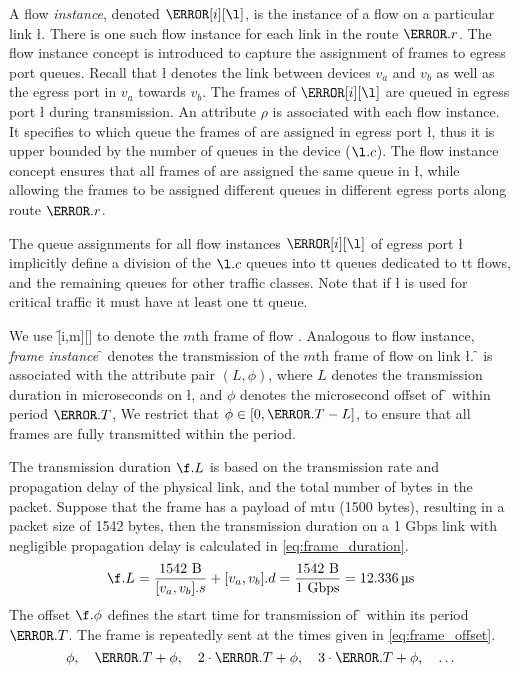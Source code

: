 A flow \emph{instance}, denoted $\s[i][\l]$, is the instance of a flow \s{} on a particular link \l.
There is one such flow instance for each link in the route $\s.r$.
The flow instance concept is introduced to capture the assignment of frames to egress port queues.
Recall that \l{} denotes the link between devices $v_a$ and $v_b$ as well as the egress port in $v_a$ towards $v_b$.
The frames of $\s[i][\l]$ are queued in egress port \l{} during transmission.
An attribute $\rho$ is associated with each flow instance. It specifies to which queue the frames of \s{} are assigned in egress port \l, thus it is upper bounded by the number of queues in the device ($\l.c$).
The flow instance concept ensures that all frames of \s{} are assigned the same queue in \l, while allowing the frames to be assigned different queues in different egress ports along route $\s.r$.

The queue assignments for all flow instances $\s[i][\l]$ of egress port \l{} implicitly define a division of the $\l.c$ queues into \gls{tt} queues dedicated to \gls{tt} flows, and the remaining queues for other traffic classes. Note that if \l{} is used for critical traffic it must have at least one \gls{tt} queue.

We use \f[i,m][] to denote the $m$th frame of flow \s{}. Analogous to flow instance, \emph{frame instance} \f{} denotes the transmission of the $m$th frame of flow \s{} on link \l{}. \f{} is associated with the attribute pair $(L, \phi)$, where $L$ denotes the transmission duration in microseconds on \l{}, and $\phi$ denotes the microsecond offset of \f{} within period $\s.T$, We restrict that $\phi \in [0, \s.T-L]$, to ensure that all frames are fully transmitted within the period.

The transmission duration $\f.L$ is based on the transmission rate and propagation delay of the physical link, and the total number of bytes in the packet.
Suppose that the frame has a payload of \gls{mtu} (1500 bytes), resulting in a packet size of 1542 bytes, then the transmission duration on a 1 Gbps link with negligible propagation delay is calculated in \autoref{eq:frame_duration}.
\begin{equation}
   \label{eq:frame_duration}
   \f.L = \frac{1542 \text{ B}}{[v_a,v_b].s} + [v_a, v_b].d = \frac{1542 \text{ B}}{1 \text{ Gbps}} =  \mus{12.336}
\end{equation}
The offset $\f.\phi$ defines the start time for transmission of \f{} within its period $\s.T$. The frame is repeatedly sent at the times given in \autoref{eq:frame_offset}.
\begin{equation}
   \label{eq:frame_offset}
   \phi, \quad \s.T + \phi , \quad 2 \cdot \s.T + \phi, \quad 3 \cdot \s.T + \phi, \quad \ldots
\end{equation}
